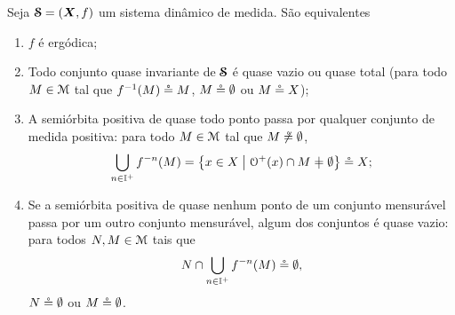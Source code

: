 \begin{proposition}
Seja $\bm{\mathcal{S}}=(\bm X,f)$ um sistema dinâmico de medida. São equivalentes
	\begin{enumerate}
	\item $f$ é ergódica;
	\item Todo conjunto quase invariante de $\bm{\mathcal{S}}$ é quase vazio ou quase total (para todo $M \in \mathcal{M}$ tal que $f^{-1}(M) \circeq M$, $M \circeq \emptyset$ ou $M \circeq X$);
	\item A semiórbita positiva de quase todo ponto passa por qualquer conjunto de medida positiva: para todo $M \in \mathcal{M}$ tal que $M \not\circeq \emptyset$,
		\begin{equation*}
		\bigcup_{n \in \I^+} f^{-n}(M) = \set{x \in X}{\Orb^+(x) \cap M \neq \emptyset} \qeq X;
		\end{equation*}
	\item Se a semiórbita positiva de quase nenhum ponto de um conjunto mensurável passa por um outro conjunto mensurável, algum dos conjuntos é quase vazio: para todos $N,M \in \mathcal{M}$ tais que
	\begin{equation*}
	N \cap \bigcup_{n \in \mathbb{I}^+}f^{-n}(M) \circeq \emptyset,
	\end{equation*}
$N \circeq \emptyset$ ou $M \circeq \emptyset$.
	\end{enumerate}
\end{proposition}
